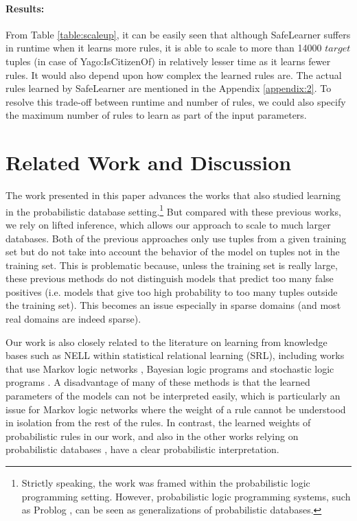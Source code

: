 \documentclass[akbc,twoside,11pt]{article}
\newcommand{\guy}[1]{\textcolor{red}{G: {#1}}}
\newcommand{\algorithmname}{SafeLearner\xspace}
\begin{document}
\paragraph{Results:} 
From Table \ref{table:scaleup}, it can be easily seen that although \algorithmname suffers in runtime when it learns more rules, it is able to scale to more than 14000 $target$ tuples (in case of Yago:IsCitizenOf) in relatively lesser time as it learns fewer rules. It would also depend upon how complex the learned rules are. The actual rules learned by \algorithmname are mentioned in the Appendix \ref{appendix:2}. To resolve this trade-off between runtime and number of rules, we could also specify the maximum number of rules to learn as part of the input parameters.

\section{Related Work and Discussion}
\label{sec:related}
The work presented in this paper advances the works \cite{DBLP:conf/ijcai/RaedtDTBV15,theobald_learning} that also studied learning in the probabilistic database setting.\footnote{Strictly speaking, the work \cite{DBLP:conf/ijcai/RaedtDTBV15} was framed within the probabilistic logic programming setting. However, probabilistic logic programming systems, such as Problog \cite{fierens2015inference}, can be seen as generalizations of probabilistic databases.} 
But compared with these previous works, we rely on lifted inference, which allows our approach to scale to much larger databases. %
Both of the previous approaches only use tuples from a given training set but do not take into account the behavior of the model on tuples not in the training set. 
This is problematic %
because, unless the training set is really large, these previous methods do not distinguish models that predict too many false positives (i.e. models that give too high probability to too many tuples outside the training set). This becomes an issue especially in sparse domains (and most real domains are indeed sparse).

Our work is also closely related to the literature on learning from knowledge bases such as NELL within statistical relational learning (SRL), including works that use Markov logic networks \cite{DBLP:conf/emnlp/SchoenmackersDEW10}, Bayesian logic programs \cite{raghavan2012learning} and stochastic logic programs \cite{lao2011random,wang2014structure}. A disadvantage of many of these methods is that the learned parameters of the models can not be interpreted easily, which is particularly an issue for Markov logic networks where the weight of a rule cannot be understood in isolation from the rest of the rules. In contrast, the learned weights of probabilistic rules in our work, and also in the other works relying on probabilistic databases \cite{DBLP:conf/ijcai/RaedtDTBV15,theobald_learning}, have a clear probabilistic interpretation.
\end{document}
